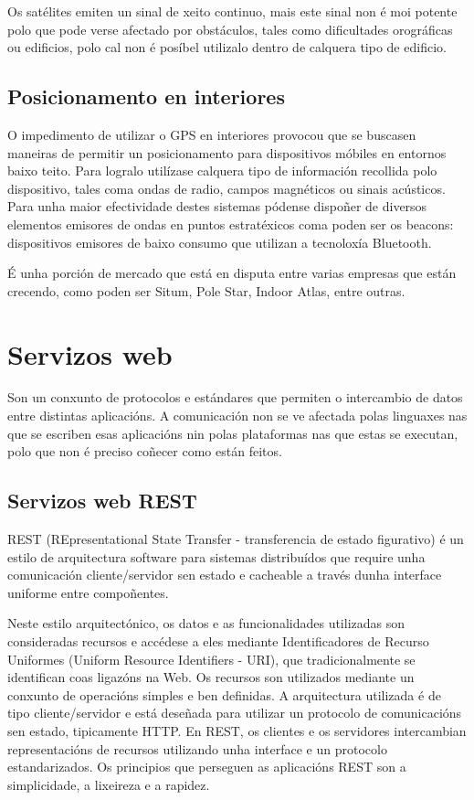 Os satélites emiten un sinal de xeito continuo, mais este sinal non é moi potente polo que pode verse afectado por obstáculos, tales como dificultades orográficas ou edificios, polo cal non é posíbel utilizalo dentro de calquera tipo de edificio.


\subsection{Posicionamento en interiores}

O impedimento de utilizar o GPS en interiores provocou que se buscasen maneiras de permitir un posicionamento para dispositivos móbiles en entornos baixo teito. Para logralo utilízase calquera tipo de información recollida polo dispositivo, tales coma ondas de radio, campos magnéticos ou sinais acústicos. Para unha maior efectividade destes sistemas pódense dispoñer de diversos elementos emisores de ondas en puntos estratéxicos coma poden ser os beacons: dispositivos emisores de baixo consumo que utilizan a tecnoloxía Bluetooth.

É unha porción de mercado que está en disputa entre varias empresas que están crecendo, como poden ser Situm, Pole Star, Indoor Atlas, entre outras.

\section{Servizos web}

Son un conxunto de protocolos e estándares que permiten o intercambio de datos entre distintas aplicacións. A comunicación non se ve afectada polas linguaxes nas que se escriben esas aplicacións nin polas plataformas nas que estas se executan, polo que non é preciso coñecer como están feitos.

\subsection{Servizos web REST}

REST (REpresentational State Transfer - transferencia de estado figurativo) é un estilo de arquitectura software para sistemas distribuídos que require unha comunicación cliente/servidor sen estado e cacheable a través dunha interface uniforme entre compoñentes.

Neste estilo arquitectónico, os datos e as funcionalidades utilizadas son consideradas recursos e accédese a eles mediante Identificadores de Recurso Uniformes (Uniform Resource Identifiers - URI), que tradicionalmente se identifican coas ligazóns na Web. Os recursos son utilizados mediante un conxunto de operacións simples e ben definidas. A arquitectura utilizada é de tipo cliente/servidor e está deseñada para utilizar un protocolo de comunicacións sen estado, tipicamente HTTP. En REST, os clientes e os servidores intercambian representacións de recursos utilizando unha interface e un protocolo estandarizados. Os principios que perseguen as aplicacións REST son a simplicidade, a lixeireza e a rapidez.